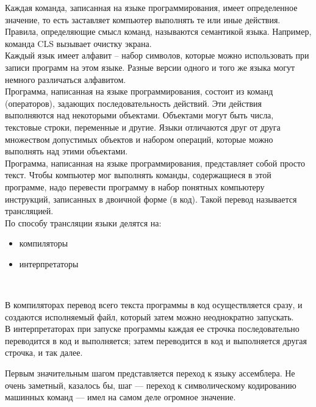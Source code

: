 Каждая команда, записанная на языке программирования, имеет определенное значение, то есть заставляет компьютер выполнять те или иные действия. Правила, определяющие смысл команд, называются семантикой языка. Например, команда CLS вызывает очистку экрана. \\

Каждый язык имеет алфавит – набор символов, которые можно использовать при записи программ на этом языке. Разные версии одного и того же языка могут немного различаться алфавитом. \\

Программа, написанная на языке программирования, состоит из команд (операторов), задающих последовательность действий. Эти действия выполняются над некоторыми объектами. Объектами могут быть числа, текстовые строки, переменные и другие. Языки отличаются друг от друга множеством допустимых объектов и набором операций, которые можно выполнять над этими объектами. \\

Программа, написанная на языке программирования, представляет собой просто текст. Чтобы компьютер мог выполнять команды, содержащиеся в этой программе, надо перевести программу в набор понятных компьютеру инструкций, записанных в двоичной форме (в код). Такой перевод называется трансляцией. \\

По способу трансляции языки делятся на: \\

\begin{itemize}
  \item компиляторы
  \item интерпретаторы
\end{itemize}
\  

В компиляторах перевод всего текста программы в код осуществляется сразу, и создаются исполняемый файл, который затем можно неоднократно запускать. \\

В интерпретаторах при запуске программы каждая ее строчка последовательно переводится в код и выполняется; затем переводится в код и выполняется другая строчка, и так далее. \\


Первым значительным шагом представляется переход к языку ассемблера. Не очень заметный, казалось бы, шаг — переход к символическому кодированию машинных команд — имел на самом деле огромное значение. \\

